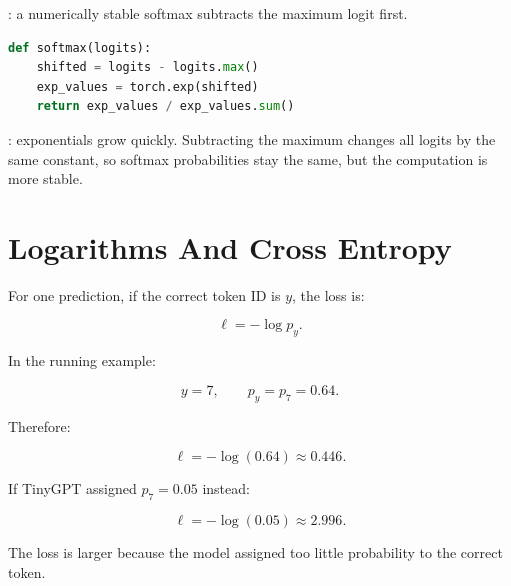 : a numerically stable softmax subtracts the maximum logit first.

\begin{lstlisting}[language=Python]
def softmax(logits):
    shifted = logits - logits.max()
    exp_values = torch.exp(shifted)
    return exp_values / exp_values.sum()
\end{lstlisting}

: exponentials grow quickly. Subtracting the maximum changes all logits by the same constant, so softmax probabilities stay the same, but the computation is more stable.

\section{Logarithms And Cross Entropy}

For one prediction, if the correct token ID is \(y\), the loss is:

\[
\ell = -\log p_y.
\]

In the running example:

\[
y=7,
\qquad
p_y = p_7 = 0.64.
\]

Therefore:

\[
\ell = -\log(0.64) \approx 0.446.
\]

If TinyGPT assigned \(p_7=0.05\) instead:

\[
\ell = -\log(0.05) \approx 2.996.
\]

The loss is larger because the model assigned too little probability to the correct token.

\begin{center}
\end{center}

